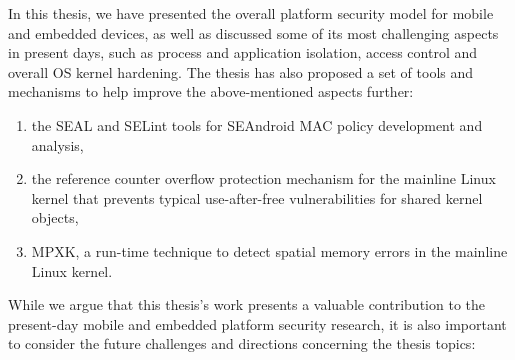 
In this thesis, we have presented the overall platform security model for mobile and embedded devices, as well as discussed some of its most challenging aspects in present days, such as process and application isolation, access control and overall OS kernel hardening.
The thesis has also proposed a set of tools and mechanisms to help improve the above-mentioned aspects further: 
\begin{enumerate}
	\item the SEAL and SELint tools for SEAndroid MAC policy development and analysis,
	\item the reference counter overflow protection mechanism for the mainline Linux kernel that prevents typical use-after-free vulnerabilities for shared kernel objects,
	\item MPXK, a run-time technique to detect spatial memory errors in the mainline Linux kernel. 
\end{enumerate}

While we argue that this thesis's work presents a valuable contribution to the present-day mobile and embedded platform security research, it is also important to consider the future challenges and directions concerning the thesis topics:

